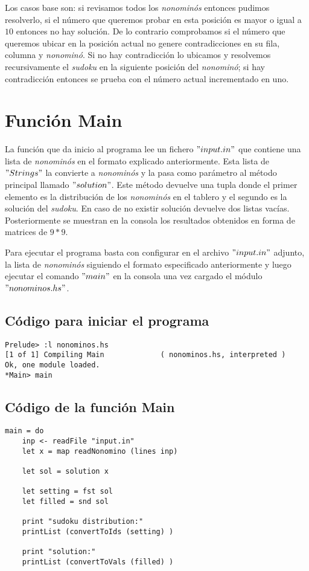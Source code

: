 \documentclass[12pt]{article}
\begin{document}
Los casos base son: si revisamos todos los \emph{nonomin\'os} entonces pudimos resolverlo, si el n\'umero que queremos probar en esta posici\'on es mayor o igual a $10$ entonces no hay soluci\'on. De lo contrario comprobamos si el n\'umero que queremos ubicar en la posici\'on actual no genere contradicciones en su fila, columna y \emph{nonomin\'o}. Si no hay contradicci\'on lo ubicamos y resolvemos recursivamente el \emph{sudoku} en la siguiente posici\'on del \emph{nonomin\'o}; si hay contradicci\'on entonces se prueba con el n\'umero actual incrementado en uno.


\section{Funci\'on Main}
La funci\'on que da inicio al programa lee un fichero $"input.in"$ que contiene una lista de \emph{nonomin\'os} en el formato explicado anteriormente. Esta lista de $"Strings"$ la convierte a \emph{nonomin\'os} y la pasa como par\'ametro al m\'etodo principal llamado $"solution"$. Este m\'etodo devuelve una tupla donde el primer elemento es la distribuci\'on de los \emph{nonomin\'os} en el tablero y el segundo es la soluci\'on del \emph{sudoku}. En caso de no existir soluci\'on devuelve dos listas vac\'ias. Posteriormente se muestran en la consola los resultados obtenidos en forma de matrices de $9 * 9$.

Para ejecutar el programa basta con configurar en el archivo $"input.in"$ adjunto, la lista de \emph{nonomin\'os} siguiendo el formato especificado anteriormente y luego ejecutar el comando $"main"$ en la consola una vez cargado el m\'odulo $"nonominos.hs"$.

\subsection{C\'odigo para iniciar el programa}
\begin{lstlisting}
Prelude> :l nonominos.hs
[1 of 1] Compiling Main             ( nonominos.hs, interpreted )
Ok, one module loaded.
*Main> main

\end{lstlisting}

\subsection{C\'odigo de la funci\'on Main}

\begin{lstlisting}
main = do
    inp <- readFile "input.in"              
    let x = map readNonomino (lines inp)   

    let sol = solution x                    

    let setting = fst sol                   
    let filled = snd sol                    

    print "sudoku distribution:"                        
    printList (convertToIds (setting) )   
    
    print "solution:"
    printList (convertToVals (filled) )    


\end{lstlisting}
\end{document}

